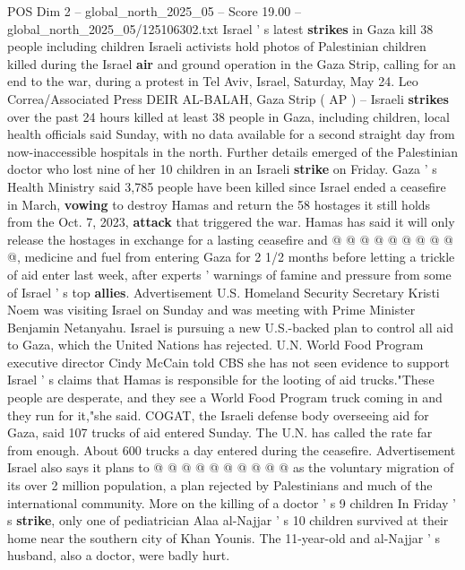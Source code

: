 \begin{textsample}{POS Dim 2 – global\_north\_2025\_05 – Score 19.00 – global\_north\_2025\_05/125106302.txt}  \label{ex:f2_pos_406}
Israel ' s latest \textbf{strikes} in Gaza kill 38 people including children Israeli activists hold photos of Palestinian children killed during the Israel \textbf{air} and ground operation in the Gaza Strip, calling for an end to the war, during a protest in Tel Aviv, Israel, Saturday, May 24.
Leo Correa/Associated Press DEIR AL-BALAH, Gaza Strip ( AP ) -- Israeli \textbf{strikes} over the past 24 hours killed at least 38 people in Gaza, including children, local health officials said Sunday, with no data available for a second straight day from now-inaccessible hospitals in the north.
Further details emerged of the Palestinian doctor who lost nine of her 10 children in an Israeli \textbf{strike} on Friday.
Gaza ' s Health Ministry said 3,785 people have been killed since Israel ended a ceasefire in March, \textbf{vowing} to destroy Hamas and return the 58 hostages it still holds from the Oct. 7, 2023, \textbf{attack} that triggered the war.
Hamas has said it will only release the hostages in exchange for a lasting ceasefire and @ @ @ @ @ @ @ @ @ @, medicine and fuel from entering Gaza for 2 1/2 months before letting a trickle of aid enter last week, after experts ' warnings of famine and pressure from some of Israel ' s top \textbf{allies}.
Advertisement U.S.
Homeland Security Secretary Kristi Noem was visiting Israel on Sunday and was meeting with Prime Minister Benjamin Netanyahu.
Israel is pursuing a new U.S.-backed plan to control all aid to Gaza, which the United Nations has rejected.
U.N.
World Food Program executive director Cindy McCain told CBS she has not seen evidence to support Israel ' s claims that Hamas is responsible for the looting of aid trucks."These people are desperate, and they see a World Food Program truck coming in and they run for it,"she said.
COGAT, the Israeli defense body overseeing aid for Gaza, said 107 trucks of aid entered Sunday.
The U.N. has called the rate far from enough.
About 600 trucks a day entered during the ceasefire.
Advertisement Israel also says it plans to @ @ @ @ @ @ @ @ @ @ as the voluntary migration of its over 2 million population, a plan rejected by Palestinians and much of the international community.
More on the killing of a doctor ' s 9 children In Friday ' s \textbf{strike}, only one of pediatrician Alaa al-Najjar ' s 10 children survived at their home near the southern city of Khan Younis.
The 11-year-old and al-Najjar ' s husband, also a doctor, were badly hurt.

\end{textsample}
